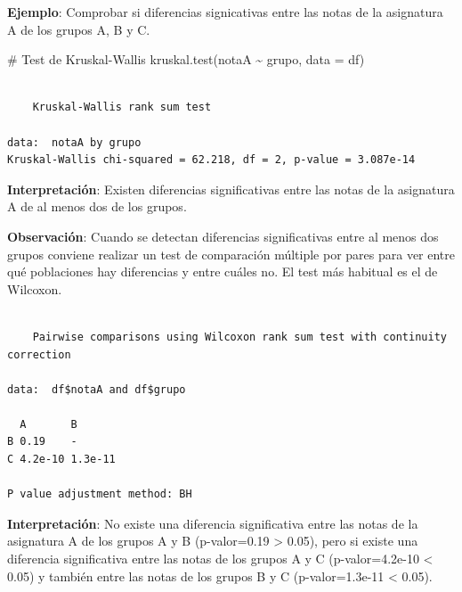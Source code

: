 \documentclass[
  spanish,
  a4paper,
]{scrreport}
\newenvironment{Shaded}{\begin{snugshade}}{\end{snugshade}}
\newcommand{\AttributeTok}[1]{\textcolor[rgb]{0.40,0.45,0.13}{#1}}
\newcommand{\CommentTok}[1]{\textcolor[rgb]{0.37,0.37,0.37}{#1}}
\newcommand{\FunctionTok}[1]{\textcolor[rgb]{0.28,0.35,0.67}{#1}}
\newcommand{\NormalTok}[1]{\textcolor[rgb]{0.00,0.23,0.31}{#1}}
\newcommand{\SpecialCharTok}[1]{\textcolor[rgb]{0.37,0.37,0.37}{#1}}
\newcommand{\StringTok}[1]{\textcolor[rgb]{0.13,0.47,0.30}{#1}}
\theoremstyle{definition}
\theoremstyle{definition}
\theoremstyle{remark}
\begin{document}
\textbf{Ejemplo}: Comprobar si diferencias signicativas entre las notas
de la asignatura A de los grupos A, B y C.

\begin{Shaded}
\begin{Highlighting}[]
\CommentTok{\# Test de Kruskal{-}Wallis}
\FunctionTok{kruskal.test}\NormalTok{(notaA }\SpecialCharTok{\textasciitilde{}}\NormalTok{ grupo, }\AttributeTok{data =}\NormalTok{ df)}
\end{Highlighting}
\end{Shaded}

\begin{verbatim}

    Kruskal-Wallis rank sum test

data:  notaA by grupo
Kruskal-Wallis chi-squared = 62.218, df = 2, p-value = 3.087e-14
\end{verbatim}

\textbf{Interpretación}: Existen diferencias significativas entre las
notas de la asignatura A de al menos dos de los grupos.

\textbf{Observación}: Cuando se detectan diferencias significativas
entre al menos dos grupos conviene realizar un test de comparación
múltiple por pares para ver entre qué poblaciones hay diferencias y
entre cuáles no. El test más habitual es el de Wilcoxon.

\begin{Shaded}
\end{Shaded}

\begin{verbatim}

    Pairwise comparisons using Wilcoxon rank sum test with continuity correction 

data:  df$notaA and df$grupo 

  A       B      
B 0.19    -      
C 4.2e-10 1.3e-11

P value adjustment method: BH 
\end{verbatim}

\textbf{Interpretación}: No existe una diferencia significativa entre
las notas de la asignatura A de los grupos A y B (p-valor=0.19
\textgreater{} 0.05), pero si existe una diferencia significativa entre
las notas de los grupos A y C (p-valor=4.2e-10 \textless{} 0.05) y
también entre las notas de los grupos B y C (p-valor=1.3e-11 \textless{}
0.05).
\end{document}
